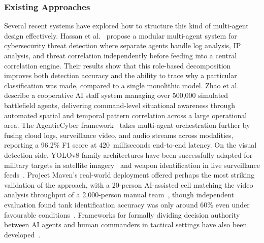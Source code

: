 \subsubsection{Existing Approaches}
Several recent systems have explored how to structure this kind of multi-agent design effectively. Hassan et al.~\cite{hassan2025multiagent} propose a modular multi-agent system for cybersecurity threat detection where separate agents handle log analysis, IP analysis, and threat correlation independently before feeding into a central correlation engine. Their results show that this role-based decomposition improves both detection accuracy and the ability to trace why a particular classification was made, compared to a single monolithic model. Zhao et al.~\cite{zhao2022deepai} describe a cooperative AI staff system managing over 500{,}000 simulated battlefield agents, delivering command-level situational awareness through automated spatial and temporal pattern correlation across a large operational area. The AgenticCyber framework~\cite{agenticcyber2025} takes multi-agent orchestration further by fusing cloud logs, surveillance video, and audio streams across modalities, reporting a 96.2\% F1 score at 420~milliseconds end-to-end latency. On the visual detection side, YOLOv8-family architectures have been successfully adapted for military targets in satellite imagery~\cite{satellite2024yolov8} and weapon identification in live surveillance feeds~\cite{weapon2023yolov8}. Project Maven's real-world deployment offered perhaps the most striking validation of the approach, with a 20-person AI-assisted cell matching the video analysis throughput of a 2{,}000-person manual team~\cite{cset2024maven}, though independent evaluation found tank identification accuracy was only around 60\% even under favourable conditions~\cite{rand2023maven}. Frameworks for formally dividing decision authority between AI agents and human commanders in tactical settings have also been developed~\cite{autonomyteaming2024}.

